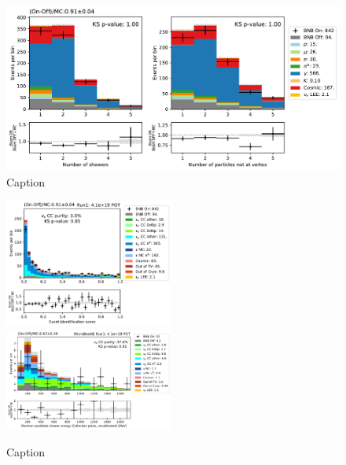 \begin{figure}
    \centering
    \includegraphics[width=\textwidth]{NueCCsel/Images/run1/bdt_2.pdf}
    \caption{Caption}
    \label{fig:bdt_2}
\end{figure}

\begin{figure}
    \centering
    \includegraphics[width=0.495\textwidth]{NueCCsel/Images/run1/pre_event_score.pdf}
    \includegraphics[width=0.495\textwidth]{NueCCsel/Images/run1/nue_shower_energy_y.pdf}
    \caption{Caption}
    \label{fig:pre_daughter_score}
\end{figure}



